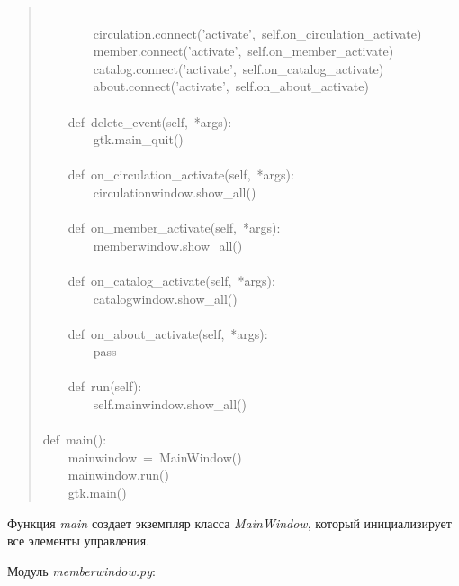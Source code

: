 \documentclass[14pt,a4paper,openany,twoside,final]{extbook}
\providecommand*{\DUroletitlereference}[1]{\textsl{#1}}
\begin{document}
\begin{quote}
{~\\
~~~~~~~~circulation.connect('activate',~self.on\_circulation\_activate)\\
~~~~~~~~member.connect('activate',~self.on\_member\_activate)\\
~~~~~~~~catalog.connect('activate',~self.on\_catalog\_activate)\\
~~~~~~~~about.connect('activate',~self.on\_about\_activate)\\
~\\
~~~~def~delete\_event(self,~*args):\\
~~~~~~~~gtk.main\_quit()\\
~\\
~~~~def~on\_circulation\_activate(self,~*args):\\
~~~~~~~~circulationwindow.show\_all()\\
~\\
~~~~def~on\_member\_activate(self,~*args):\\
~~~~~~~~memberwindow.show\_all()\\
~\\
~~~~def~on\_catalog\_activate(self,~*args):\\
~~~~~~~~catalogwindow.show\_all()\\
~\\
~~~~def~on\_about\_activate(self,~*args):\\
~~~~~~~~pass\\
~\\
~~~~def~run(self):\\
~~~~~~~~self.mainwindow.show\_all()\\
~\\
def~main():\\
~~~~mainwindow~=~MainWindow()\\
~~~~mainwindow.run()\\
~~~~gtk.main()
}
\end{quote}

Функция \DUroletitlereference{main} создает экземпляр класса \DUroletitlereference{MainWindow}, который
инициализирует все элементы управления.

Модуль \DUroletitlereference{memberwindow.py}:
\end{document}
